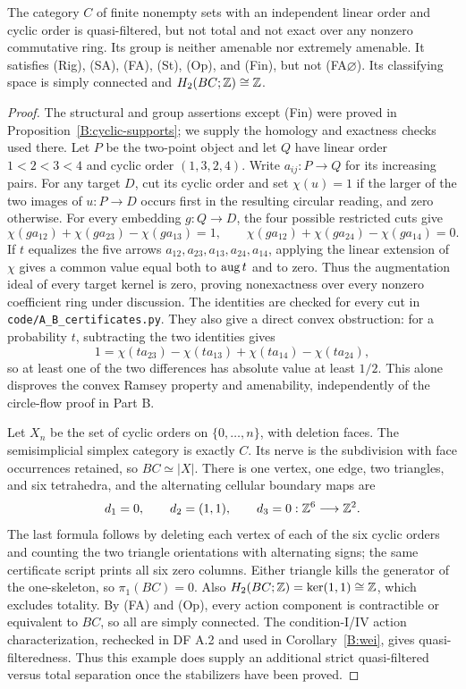 \begin{proposition}
\label{A:cyclic-classification}
The category $C$ of finite nonempty sets with an independent
linear order and cyclic order is quasi-filtered, but not total
and not exact over any nonzero commutative ring. Its group is
neither amenable nor extremely amenable. It satisfies (Rig),
(SA), (FA), (St), (Op), and (Fin), but not (FA$\varnothing$).
Its classifying space is simply connected and
$H_2(BC;\mathbb Z)\cong\mathbb Z$.
\end{proposition}
\begin{proof}
The structural and group assertions except (Fin) were proved
in Proposition~\ref{B:cyclic-supports}; we supply the homology
and exactness checks used there. Let $P$ be the two-point
object and let $Q$ have linear order $1<2<3<4$ and cyclic
order $(1,3,2,4)$. Write $a_{ij}:P\to Q$ for its increasing
pairs. For any target $D$, cut its cyclic order and set
$\chi(u)=1$ if the larger of the two images of $u:P\to D$
occurs first in the resulting circular reading, and zero
otherwise. For every embedding $g:Q\to D$, the four
possible restricted cuts give
\[
 \chi(ga_{12})+\chi(ga_{23})-\chi(ga_{13})=1,
 \qquad
 \chi(ga_{12})+\chi(ga_{24})-\chi(ga_{14})=0.
\]
If $t$ equalizes the five arrows
$a_{12},a_{23},a_{13},a_{24},a_{14}$, applying the linear
extension of $\chi$ gives a common value equal both to
$\operatorname{aug} t$ and to zero. Thus the augmentation ideal of every
target kernel is zero, proving nonexactness over every
nonzero coefficient ring under discussion. The identities
are checked for every cut in \texttt{code/A\_B\_certificates.py}.
They also give a direct convex obstruction: for a probability
$t$, subtracting the two identities gives
\[
 1=\chi(ta_{23})-\chi(ta_{13})
       +\chi(ta_{14})-\chi(ta_{24}),
\]
so at least one of the two differences has absolute value
at least $1/2$. This alone disproves the convex Ramsey
property and amenability, independently of the circle-flow
proof in Part B.

Let $X_n$ be the set of cyclic orders on $\{0,\ldots,n\}$,
with deletion faces. The semisimplicial simplex category is
exactly $C$. Its nerve is the subdivision with face
occurrences retained, so $BC\simeq |X|$. There is one
vertex, one edge, two triangles, and six tetrahedra, and
the alternating cellular boundary maps are
\[
 d_1=0,\qquad d_2=(1,1),\qquad
 d_3=0:\mathbb Z^6\longrightarrow\mathbb Z^2.
\]
The last formula follows by deleting each vertex of each
of the six cyclic orders and counting the two triangle
orientations with alternating signs; the same certificate
script prints all six zero columns. Either triangle kills
the generator of the one-skeleton, so $\pi_1(BC)=0$.
Also $H_2(BC;\mathbb Z)=\ker(1,1)\cong\mathbb Z$, which excludes
totality. By (FA) and (Op), every action component is
contractible or equivalent to $BC$, so all are simply
connected. The condition-I/IV action characterization,
rechecked in DF A.2 and used in Corollary~\ref{B:wei}, gives
quasi-filteredness. Thus this example does supply an
additional strict quasi-filtered versus total separation
once the stabilizers have been proved.


\end{proof}
